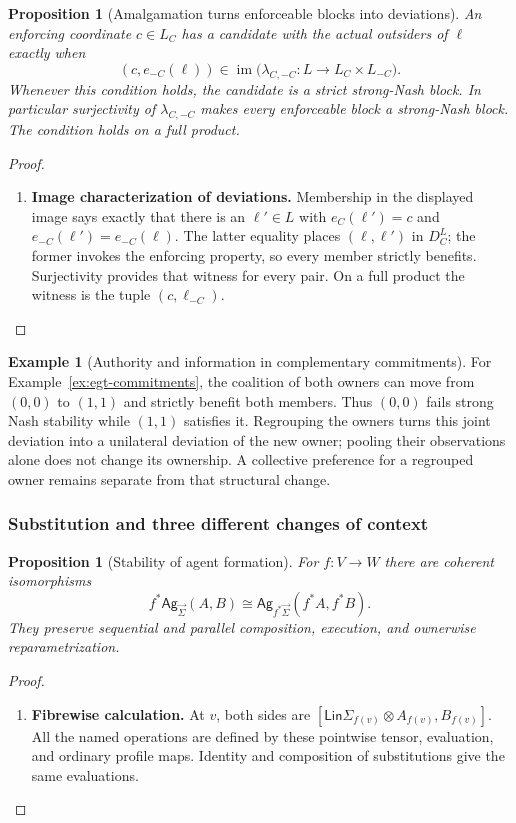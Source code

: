 \documentclass[11pt,a4paper]{article}
\numberwithin{equation}{section}
\newtheorem{proposition}[theorem]{Proposition}
\theoremstyle{definition}
\newtheorem{example}[theorem]{Example}
\theoremstyle{remark}
\theoremstyle{plain}
\providecommand{\Ag}{\mathsf{Ag}}
\providecommand{\sig}{\vec{\Sigma}}
\providecommand{\Lin}{\mathsf{Lin}}
\begin{document}
\begin{proposition}[Amalgamation turns enforceable blocks into deviations]
An enforcing coordinate $c\in L_C$ has a candidate with the actual outsiders
of $\ell$ exactly when
\[
 (c,e_{-C}(\ell))\in\operatorname{im}
 \bigl(\lambda_{C,-C}:L\to L_C\times L_{-C}\bigr).
\]
Whenever this condition holds, the candidate is a strict strong-Nash block.
In particular surjectivity of $\lambda_{C,-C}$ makes every enforceable block
a strong-Nash block. The condition holds on a full product.
\end{proposition}
\begin{proof}
\leavevmode
\begin{enumerate}[label=\textup{(\arabic*)},leftmargin=*,itemsep=4pt,topsep=3pt]
  \item \textbf{Image characterization of deviations.} Membership in the displayed image says exactly that there is an
$\ell'\in L$ with $e_C(\ell')=c$ and
$e_{-C}(\ell')=e_{-C}(\ell)$. The latter equality places
$(\ell,\ell')$ in $D_C^L$; the former invokes the enforcing property, so
every member strictly benefits. Surjectivity provides that witness for
every pair. On a full product the witness is the tuple
$(c,\ell_{-C})$.
\end{enumerate}
\end{proof}

\begin{example}[Authority and information in complementary commitments]
For Example~\ref{ex:egt-commitments}, the coalition of both owners can move
from $(0,0)$ to $(1,1)$ and strictly benefit both members. Thus $(0,0)$
fails strong Nash stability while $(1,1)$ satisfies it. Regrouping the owners
turns this joint deviation into a unilateral deviation of the new owner;
pooling their observations alone does not change its ownership. A collective
preference for a regrouped owner remains separate from that structural change.
\end{example}

\subsubsection{Substitution and three different changes of context}

\begin{proposition}[Stability of agent formation]
\label{agt-prop-agent-basechange}
For $f:V\to W$ there are coherent isomorphisms
\[
 f^*\Ag_{\sig}(A,B)
 \cong\Ag_{f^*\sig}(f^*A,f^*B).
\]
They preserve sequential and parallel composition, execution, and
ownerwise reparametrization.
\end{proposition}
\begin{proof}
\leavevmode
\begin{enumerate}[label=\textup{(\arabic*)},leftmargin=*,itemsep=4pt,topsep=3pt]
  \item \textbf{Fibrewise calculation.} At $v$, both sides are
$[\Lin\Sigma_{f(v)}\otimes A_{f(v)},B_{f(v)}]$. All the named operations
are defined by these pointwise tensor, evaluation, and ordinary profile
maps. Identity and composition of substitutions give the same evaluations.
\end{enumerate}
\end{proof}
\end{document}
